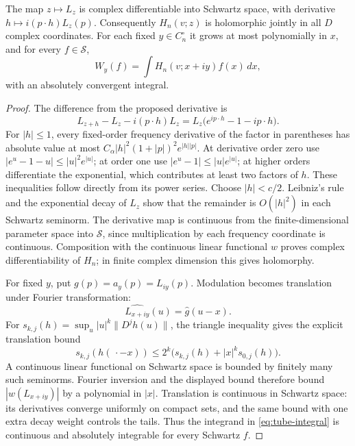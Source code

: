 \begin{proposition}\label{prop:full-tube-holomorphic}
The map $z\mapsto L_z$ is complex differentiable into Schwartz space,
with derivative $h\mapsto i(p\cdot h)L_z(p)$. Consequently
$H_n(v;z)$ is holomorphic jointly in all $D$ complex coordinates.
For each fixed $y\in C_n^\circ$ it grows at most polynomially in $x$,
and for every $f\in\mathscr S$,
\begin{equation}\label{eq:tube-integral}
 W_y(f)=\int H_n(v;x+iy)f(x)\,dx,
\end{equation}
with an absolutely convergent integral.
\end{proposition}
\begin{proof}
The difference from the proposed derivative is
\[
 L_{z+h}-L_z-i(p\cdot h)L_z
 =L_z\big(e^{ip\cdot h}-1-ip\cdot h\big).
\]
For $|h|\leq1$, every fixed-order frequency derivative of the factor
in parentheses has absolute value at most
$C_\alpha |h|^2(1+|p|)^2e^{|h||p|}$.
At derivative order zero use
$|e^u-1-u|\leq|u|^2e^{|u|}$; at order one use
$|e^u-1|\leq|u|e^{|u|}$; at higher orders differentiate the exponential,
which contributes at least two factors of $h$. These inequalities follow
directly from its power series. Choose $|h|<c/2$. Leibniz's rule and the
exponential decay of $L_z$ show that the remainder is $O(|h|^2)$ in
each Schwartz seminorm. The derivative map is continuous from the
finite-dimensional parameter space into $\mathscr S$, since multiplication
by each frequency coordinate is continuous. Composition with the continuous
linear functional $w$ proves complex differentiability of $H_n$;
in finite complex dimension this gives holomorphy.

For fixed $y$, put $g(p)=a_y(p)=L_{iy}(p)$. Modulation becomes translation
under Fourier transformation:
\[
 \widehat{L_{x+iy}}(u)=\widehat g(u-x).
\]
For $s_{k,j}(h)=\sup_u |u|^k\|D^j h(u)\|$, the triangle inequality
gives the explicit translation bound
\[
 s_{k,j}(h(\,\cdot-x))
 \leq2^k\big(s_{k,j}(h)+|x|^k s_{0,j}(h)\big).
\]
A continuous linear functional on Schwartz space is bounded by finitely
many such seminorms. Fourier inversion and the displayed bound therefore
bound $|w(L_{x+iy})|$ by a polynomial in $|x|$. Translation is continuous
in Schwartz space: its derivatives converge uniformly on compact sets,
and the same bound with one extra decay weight controls the tails.
Thus the integrand in \eqref{eq:tube-integral} is continuous and absolutely
integrable for every Schwartz $f$.


\end{proof}
